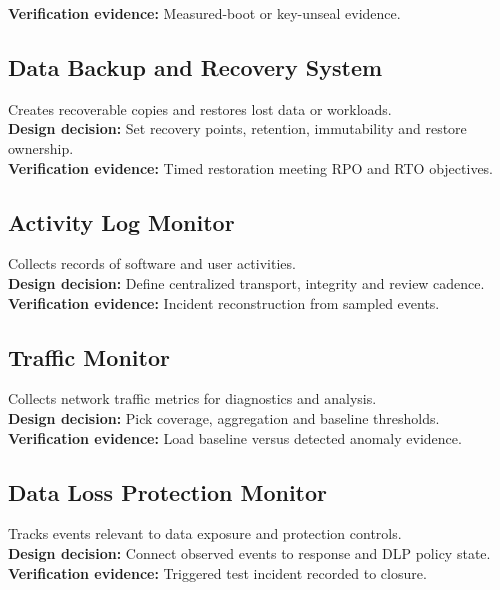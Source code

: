 \documentclass[10pt,letterpaper]{article}
\begin{document}
\textbf{Verification evidence:} Measured-boot or key-unseal evidence.\\[3pt]
\subsection{Data Backup and Recovery System}
Creates recoverable copies and restores lost data or workloads.\\[4pt]
\textbf{Design decision:} Set recovery points, retention, immutability and restore ownership.\\[3pt]
\textbf{Verification evidence:} Timed restoration meeting RPO and RTO objectives.\\[3pt]
\subsection{Activity Log Monitor}
Collects records of software and user activities.\\[4pt]
\textbf{Design decision:} Define centralized transport, integrity and review cadence.\\[3pt]
\textbf{Verification evidence:} Incident reconstruction from sampled events.\\[3pt]
\subsection{Traffic Monitor}
Collects network traffic metrics for diagnostics and analysis.\\[4pt]
\textbf{Design decision:} Pick coverage, aggregation and baseline thresholds.\\[3pt]
\textbf{Verification evidence:} Load baseline versus detected anomaly evidence.\\[3pt]
\subsection{Data Loss Protection Monitor}
Tracks events relevant to data exposure and protection controls.\\[4pt]
\textbf{Design decision:} Connect observed events to response and DLP policy state.\\[3pt]
\textbf{Verification evidence:} Triggered test incident recorded to closure.\\[3pt]
\end{document}
